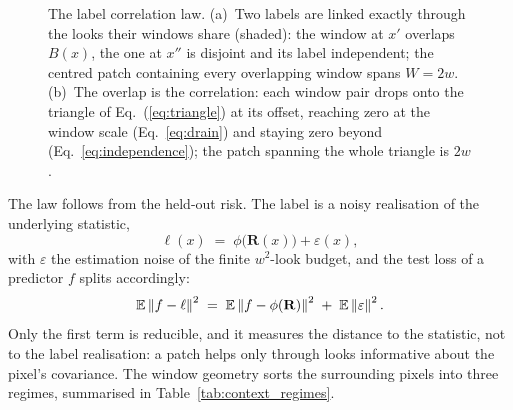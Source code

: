 \begin{figure}[H]
\begin{subfigure}[b]{0.44\textwidth}
    \caption{}
    \label{fig:corr_law_triangle}
  \end{subfigure}
  \caption{The label correlation law. (a)~Two labels are linked exactly through the looks their windows share (shaded): the window at $x'$ overlaps $B(x)$, the one at $x''$ is disjoint and its label independent; the centred patch containing every overlapping window spans $W = 2w$. (b)~The overlap is the correlation: each window pair drops onto the triangle of Eq.~(\ref{eq:triangle}) at its offset, reaching zero at the window scale (Eq.~\ref{eq:drain}) and staying zero beyond (Eq.~\ref{eq:independence}); the patch spanning the whole triangle is $2w$.}
  \label{fig:corr_law}
\end{figure}

The law follows from the held-out risk. The label is a noisy realisation of the underlying statistic,
\begin{equation}
  \ell(x) \;=\; \phi\bigl(\mathbf{R}(x)\bigr) + \varepsilon(x),
  \label{eq:label_noise}
\end{equation}
with $\varepsilon$ the estimation noise of the finite $w^2$-look budget, and the test loss of a predictor $f$ splits accordingly:
\begin{equation}
  \mathbb{E} \left\lVert f - \ell \right\rVert^2 \;=\; \mathbb{E} \left\lVert f - \phi(\mathbf{R}) \right\rVert^2 \;+\; \mathbb{E} \left\lVert \varepsilon \right\rVert^2.
  \label{eq:risk_decomp}
\end{equation}
Only the first term is reducible, and it measures the distance to the statistic, not to the label realisation: a patch helps only through looks informative about the pixel's covariance. The window geometry sorts the surrounding pixels into three regimes, summarised in Table~\ref{tab:context_regimes}.

